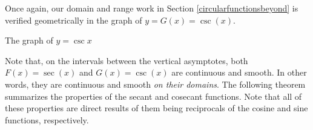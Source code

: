 \medskip

Once again, our domain and range work in Section \ref{circularfunctionsbeyond} is verified geometrically in the graph of $y = G(x) = \csc(x)$.

\medskip

\noindent\begin{minipage}{\textwidth}
\begin{center}
\end{center}
\captionsetup{type=figure}
\caption{The graph of $y=\csc{x}$}\label{fig:cscgraph2}
\end{minipage}

\medskip



Note that, on the intervals between the vertical asymptotes, both $F(x) = \sec(x)$ and $G(x) = \csc(x)$ are continuous and smooth.  In other words, they are continuous and smooth \textit{on their domains}.
The following theorem summarizes the properties of the secant and cosecant functions.  Note that all of these properties are direct results of them being reciprocals of the cosine and sine functions, respectively.


\smallskip

